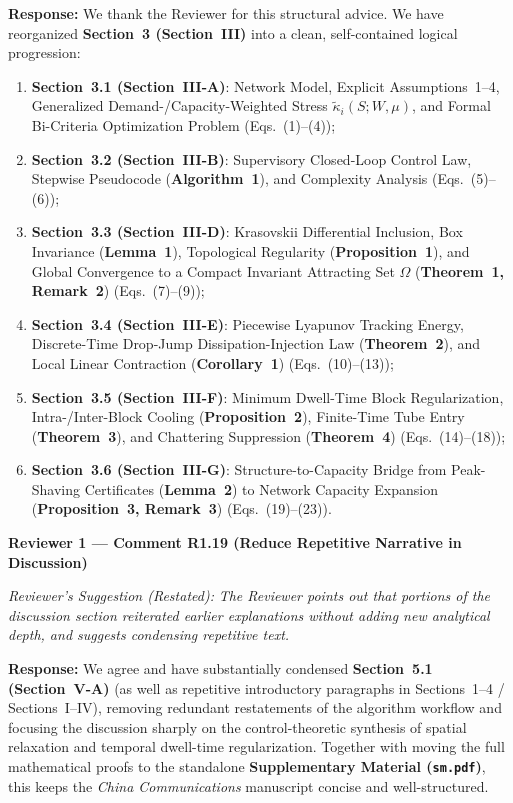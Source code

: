 \documentclass[11pt,a4paper]{article}
\newcommand{\cbox}[2]{%
  \vspace{0.6em}\noindent\textbf{#1}\par\smallskip
  \noindent\textit{Reviewer's Suggestion (Restated):} \textit{#2}\par\smallskip
}
\begin{document}
\noindent\textbf{Response:} We thank the Reviewer for this structural advice. We have reorganized \textbf{Section~3 (Section~III)} into a clean, self-contained logical progression:
\begin{enumerate}[leftmargin=1.8em]
    \item \textbf{Section~3.1 (Section~III-A)}: Network Model, Explicit Assumptions~1--4, Generalized Demand-/Capacity-Weighted Stress $\widetilde{\kappa}_i(S;W,\mu)$, and Formal Bi-Criteria Optimization Problem (Eqs.~(1)--(4));
    \item \textbf{Section~3.2 (Section~III-B)}: Supervisory Closed-Loop Control Law, Stepwise Pseudocode (\textbf{Algorithm~1}), and Complexity Analysis (Eqs.~(5)--(6));
    \item \textbf{Section~3.3 (Section~III-D)}: Krasovskii Differential Inclusion, Box Invariance (\textbf{Lemma~1}), Topological Regularity (\textbf{Proposition~1}), and Global Convergence to a Compact Invariant Attracting Set $\Omega$ (\textbf{Theorem~1, Remark~2}) (Eqs.~(7)--(9));
    \item \textbf{Section~3.4 (Section~III-E)}: Piecewise Lyapunov Tracking Energy, Discrete-Time Drop-Jump Dissipation-Injection Law (\textbf{Theorem~2}), and Local Linear Contraction (\textbf{Corollary~1}) (Eqs.~(10)--(13));
    \item \textbf{Section~3.5 (Section~III-F)}: Minimum Dwell-Time Block Regularization, Intra-/Inter-Block Cooling (\textbf{Proposition~2}), Finite-Time Tube Entry (\textbf{Theorem~3}), and Chattering Suppression (\textbf{Theorem~4}) (Eqs.~(14)--(18));
    \item \textbf{Section~3.6 (Section~III-G)}: Structure-to-Capacity Bridge from Peak-Shaving Certificates (\textbf{Lemma~2}) to Network Capacity Expansion (\textbf{Proposition~3, Remark~3}) (Eqs.~(19)--(23)).
\end{enumerate}

\hrulefill

\cbox{Reviewer 1 --- Comment R1.19 (Reduce Repetitive Narrative in Discussion)}{The Reviewer points out that portions of the discussion section reiterated earlier explanations without adding new analytical depth, and suggests condensing repetitive text.}

\noindent\textbf{Response:} We agree and have substantially condensed \textbf{Section~5.1 (Section~V-A)} (as well as repetitive introductory paragraphs in Sections~1--4 / Sections~I--IV), removing redundant restatements of the algorithm workflow and focusing the discussion sharply on the control-theoretic synthesis of spatial relaxation and temporal dwell-time regularization. Together with moving the full mathematical proofs to the standalone \textbf{Supplementary Material (\texttt{sm.pdf})}, this keeps the \textit{China Communications} manuscript concise and well-structured.
\end{document}
